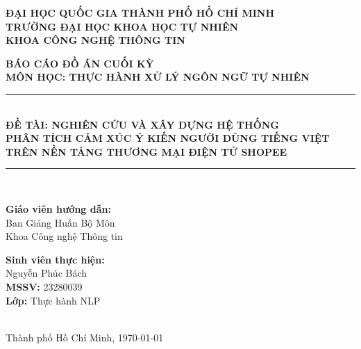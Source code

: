 \documentclass[12pt,a4paper]{article}
\begin{document}
\begin{titlepage}
    \centering
    \vspace*{1cm}
    
    {\large \textbf{ĐẠI HỌC QUỐC GIA THÀNH PHỐ HỒ CHÍ MINH}}\\[0.2cm]
    {\large \textbf{TRƯỜNG ĐẠI HỌC KHOA HỌC TỰ NHIÊN}}\\[0.2cm]
    {\large \textbf{KHOA CÔNG NGHỆ THÔNG TIN}}\\[1.5cm]
    
    \begin{figure}[H]
        \centering
        \vspace{1cm}
    \end{figure}
    
    {\Large \textbf{BÁO CÁO ĐỒ ÁN CUỐI KỲ}}\\[0.4cm]
    {\LARGE \textbf{MÔN HỌC: THỰC HÀNH XỬ LÝ NGÔN NGỮ TỰ NHIÊN}}\\[1.5cm]
    
    \rule{\textwidth}{1.5pt}\\[0.5cm]
    {\Large \bfseries ĐỀ TÀI: NGHIÊN CỨU VÀ XÂY DỰNG HỆ THỐNG}\\[0.2cm]
    {\Large \bfseries PHÂN TÍCH CẢM XÚC Ý KIẾN NGƯỜI DÙNG TIẾNG VIỆT}\\[0.2cm]
    {\Large \bfseries TRÊN NỀN TẢNG THƯƠNG MẠI ĐIỆN TỬ SHOPEE}\\[0.5cm]
    \rule{\textwidth}{1.5pt}\\[2.5cm]
    
    \begin{minipage}[t]{0.45\textwidth}
        \large
        \textbf{Giáo viên hướng dẫn:}\\
        Ban Giảng Huấn Bộ Môn\\
        Khoa Công nghệ Thông tin
    \end{minipage}
    \hfill
    \begin{minipage}[t]{0.45\textwidth}
        \flushright
        \large
        \textbf{Sinh viên thực hiện:}\\
        Nguyễn Phúc Bách\\
        \textbf{MSSV:} 23280039\\
        \textbf{Lớp:} Thực hành NLP
    \end{minipage}\\[3cm]
    
    \vfill
    {\large Thành phố Hồ Chí Minh, \today}
\end{titlepage}
\end{document}
